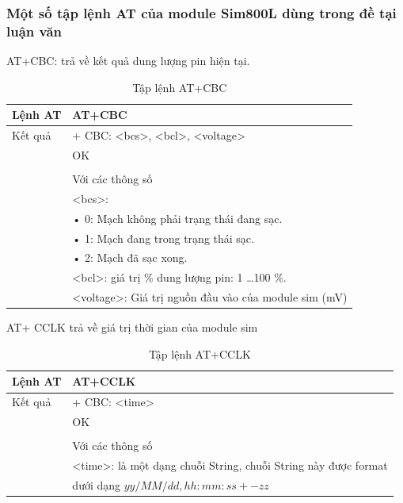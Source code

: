 \newpage
\subsubsection*{Một số tập lệnh AT của module Sim800L dùng trong đề tại luận văn}


 AT+CBC: trả về kết quả dung lượng pin hiện tại.
\begin{table}[H]
\label{table:at+cbc}
\begin{tabular}{|l|l|}
\hline
Lệnh AT & AT+CBC \\ \hline
Kết quả  & 
+ CBC: <bcs>, <bcl>, <voltage> \\
&OK \\
& \\
& Với các thông số \\
& \hspace{0.5cm} <bcs>: \\
& \hspace{2cm} • 0: Mạch không phải trạng thái đang sạc. \\
& \hspace{2cm} • 1: Mạch đang trong trạng thái sạc. \\
& \hspace{2cm} • 2: Mạch đã sạc xong. \\
& \hspace{0.5cm} <bcl>: giá trị \% dung lượng pin: 1 …100 \%. \\
& \hspace{0.5cm} <voltage>: Giá trị nguồn đầu vào của module sim (mV) \\\hline
\end{tabular}
\caption[Tập lệnh AT+CBC: kết quả dung lượng pin hiện tại]{Tập lệnh AT+CBC}
\end{table}



 AT+ CCLK trả về giá trị thời gian của module sim
\begin{table}[H]
\label{table:at+cclk}
\begin{tabular}{|l|l|}
\hline
Lệnh AT & AT+CCLK \\ \hline
Kết quả  & 
+ CBC: <time> \\
&OK \\
& \\
& Với các thông số \\
& \hspace{0.5cm}<time>: là một dạng chuỗi String, chuỗi String này được format\\
& \hspace{0.5cm} dưới dạng $yy/MM/dd, hh:mm:ss+-zz$ \\\hline
\end{tabular}

\caption[Tập lệnh AT+CCLK: trả về giá trị thời gian của module sim]{Tập lệnh AT+CCLK}
\end{table}



